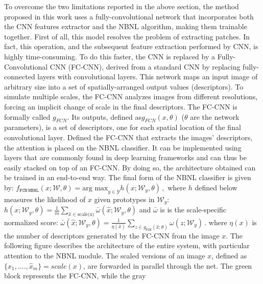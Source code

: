 To overcome the two limitations reported in the above section, the
method proposed in this work uses a fully-convolutional network that
incorporates both the CNN features extractor and the NBNL algorithm,
making them trainable together. First of all, this model resolves the
problem of extracting patches. In fact, this operation, and the
subsequent feature extraction performed by CNN, is highly
time-consuming. To do this faster, the CNN is replaced by a
Fully-Convolutional CNN (FC-CNN), derived from a standard CNN by
replacing fully-connected layers with convolutional layers. This network
maps an input image of arbitrary size into a set of spatially-arranged
output values (descriptors). To simulate multiple scales, the FC-CNN
analyzes images from different resolutions, forcing an implicit change
of scale in the final descriptors. The FC-CNN is formally called
$g_{FCN}$. Its outputs, defined as$g_{FCN}(x, \theta)$ ($\theta$
are the network parameters), is a set of descriptors, one for each
spatial location of the final convolutional layer. Defined the FC-CNN
that extracts the images' descriptors, the attention is placed on the
NBNL classifier. It can be implemented using layers that are commonly
found in deep learning frameworks and can thus be easily stacked on top
of an FC-CNN. By doing so, the architecture obtained can be trained in
an end-to-end way. The final form of the NBNL classifier is given by:
\newline
$ f_\mathtt {FCN\,NBNL}(x; {\mathcal W},\theta)=\text{arg max}_{y\in {\mathcal Y}}h(x; {\mathcal W} _y,\theta)\,, $
\newline
where $h$ defined below measures the likelihood of $x$ given
prototypes in ${\mathcal W}_y$:
\newline
$ h(x; {\mathcal W} _y,\theta)=\frac{1}{m}\sum _{\hat{x}\in \text{scale(x)}}\bar{\omega }(\hat{x}; {\mathcal W} _y,\theta) $
\newline
and $\bar \omega$ is is the scale-specific normalized score:
\newline
$ \bar{\omega }(\hat{x}; {\mathcal W} _y,\theta)=\frac{1}{\eta (\hat{x})}\sum _{z\in g_\mathtt {FCN}(\hat{x};\theta)}\omega (z; {\mathcal W} _y)\,. $
\newline
where $\eta(x)$ is the number of descriptors generated by the FC-CNN
from the image $x$. The following figure describes the architecture of
the entire system, with particular attention to the NBNL module. The
scaled versions of an image $x$, defined as
$\{\hat x_1, ...., \hat x_m\} = scale (x)$, are forwarded in parallel
through the net. The green block represents the FC-CNN, while the gray
